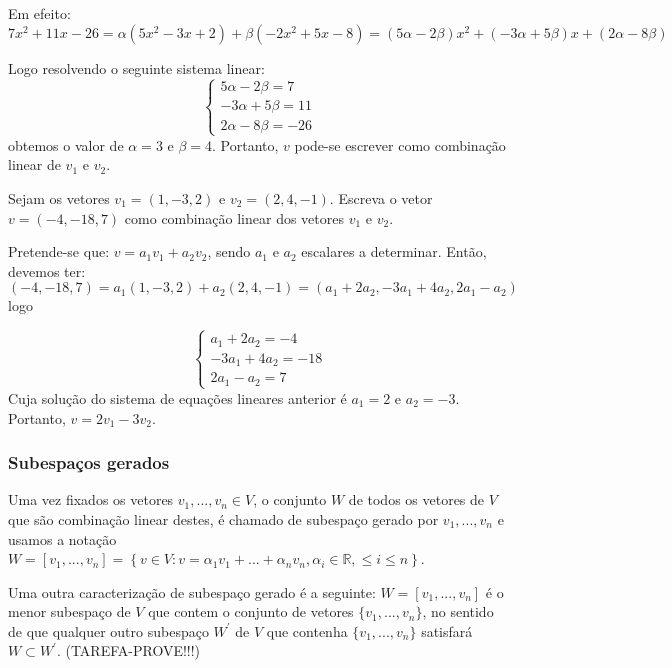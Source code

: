 Em efeito:\\
$7x^{2}+11x-26=\alpha (5x^{2}-3x+2)+\beta(-2x^{2}+5x-8)=(5\alpha-2\beta)x^{2}+(-3\alpha+5\beta)x+(2\alpha-8\beta)$

Logo resolvendo o seguinte sistema linear: 
\begin{equation*}
\begin{cases}
5\alpha-2\beta=7   \\
-3\alpha+5\beta=11 \\
2\alpha-8\beta=-26 
\end{cases}
\end{equation*} 
obtemos o valor de $\alpha=3$ e $\beta=4$. Portanto, $v$ pode-se escrever como combinação linear de $v_{1}$ e $v_{2}$. 
\begin{ex}
	Sejam os vetores $v_{1}=(1,-3,2)$ e $v_{2}=(2,4,-1)$. Escreva o vetor $v=(-4,-18,7)$ como combinação linear dos vetores $v_{1}$ e $v_{2}$.
\end{ex}
Pretende-se que: $v=a_{1} v_{1}+a_{2} v_{2}$, sendo $a_{1}$ e $a_{2}$ escalares a determinar. Então, devemos ter: $(-4,-18,7)=a_{1}(1,-3,2)+a_{2}(2,4,-1)=(a_{1}+2a_{2},-3a_{1}+4a_{2},2a_{1}-a_{2})$ logo 

\begin{equation*}
\begin{cases}
a_{1}+2a_{2}=-4   \\
-3a_{1}+4a_{2}=-18 \\
2a_{1}-a_{2}=7 
\end{cases}
\end{equation*}
Cuja solução do sistema de equações lineares anterior é $a_{1}=2$ e $a_{2}=-3$. Portanto, $v=2v_{1}-3v_{2}$.

\subsubsection{Subespaços gerados}
Uma vez fixados os vetores $v_{1},...,v_{n}\in V$, o conjunto $W$ de todos os vetores de $V$ que são combinação linear destes, é chamado de subespaço gerado por $v_{1},...,v_{n}$ e usamos a notação\\

$W=\left[ v_{1},...,v_{n}\right]=\left\lbrace v\in V:v=\alpha_{1}v_{1}+...+\alpha_{n}v_{n}, \alpha_{i}\in \mathbb{R}, \leqslant i\leqslant n  \right\rbrace $.

Uma outra caracterização de subespaço gerado é a seguinte: $W=\left[ v_{1},...,v_{n}\right]$ é o menor subespaço de $V$ que contem o conjunto de vetores $\{v_{1},...,v_{n}\}$, no sentido de que qualquer outro subespaço $W^{'}$ de $V$ que contenha $\{v_{1},...,v_{n}\}$ satisfará $W\subset W^{'}$. (TAREFA-PROVE!!!)

